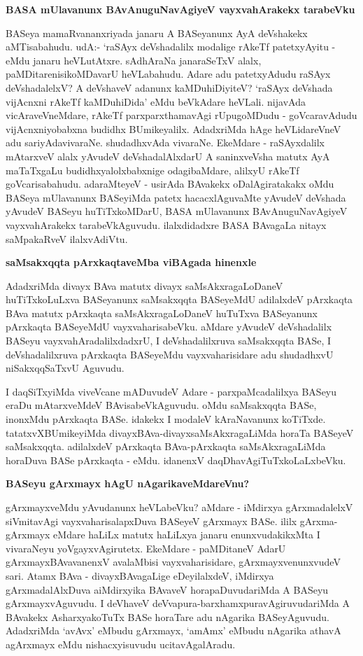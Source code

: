 {\bigskip
\noindent
{\large\bf BASA mUlavanunx BAvAnuguNavAgiyeV vayxvahArakekx tarabeVku}}\label{page10}
\medskip

\noindent
BASeya mamaRvananxriyada janaru A BASeyanunx AyA deVshakekx aMTisabahudu. udA:- `raSAyx deVshadalilx modalige rAkeTf patetxyAyitu - eMdu janaru heVLu\-tAtxre. sAdhAraNa janaraSeTxV alalx, paMDitarenisikoMDavarU heVLabahudu. Adare adu patetxyAdudu raSAyx deVshadalelxV? A \-deVshaveV adanunx kaMDuhiDiyiteV? `raSAyx deVshada vijAcnxni rAkeTf kaMDuhiDida' eMdu beVkAdare heVLali. nija\-vAda vicAra\-veVneMdare, rAkeTf parxparxthamavAgi rUpugoMDudu - goVcaravAdudu vijAcnxni\-yobabxna budidhx BUmikeyalilx. AdadxriMda hAge heVLidareVneV adu sariyAda\break viva\-raNe. shudadhxvAda vivaraNe. EkeMdare - raSAyxdalilx mAtarxveV alalx yAvudeV deVsha\-dalAlxdarU A saninxveVsha matutx AyA maTaTx\-gaLu budidhxyalolxbabxnige odagibaMdare, alilxyU rAkeTf goVcarisabahudu. adaraMteyeV - usi\-rAda BAvakekx oDalAgi\-ratakakx oMdu BASeya mUlavanunx BASeyiMda patetx hacacxlAguvaMte yAvudeV deVshada\- yAvudeV BASeyu huTiTxkoMDarU, BASA mUlavanunx BAvAnuguNa\-vAgiyeV vayxvahArakekx tarabeVkAguvudu. ilalxdidadxre BASA BAvagaLa nitayx saMpa\-kaRveV ilalxvAdiVtu.

{\bigskip
\noindent
{\large\bf saMsakxqqta pArxkaqtaveMba viBAgada hinenxle}}\label{page11}
\medskip

\noindent
AdadxriMda divayx BAva matutx divayx saMsAkxragaLoDaneV huTiTxkoLuLxva BASeyanunx saMsakxqqta BASe\-yeMdU adilalxdeV pArxkaqta BAva matutx pArxkaqta saMsAkxragaLoDaneV huTuTxva BASeyanunx pArxkaqta BASe\-yeMdU vayxvaharisabeVku. aMdare yAvudeV deVshadalilx BASeyu vayxvahAradalilxdadxrU, I deVshadalilxruva saMsakxqqta BASe, I deVshadalilxruva pArxkaqta BASeyeMdu vayxvaharisidare adu shudadhxvU niSakxqqSaTxvU Agu\-vudu.

I daqSiTxyiMda viveVcane mADuvudeV Adare - parxpaMcadalilxya BASeyu eraDu mAtarxveMdeV BAvisabeVkAguvudu. oMdu saMsakxqqta BASe, inonxMdu pArxkaqta BASe. idakekx I modaleV kAraNa\-vanunx koTiTxde. tatatxvXBUmikeyiMda divayxBAva-divayxsaMsAkxragaLiMda horaTa BASeyeV saMsakxqqta. adi\-lalxdeV pArxkaqta BAva-pArxkaqta saMsAkxragaLiMda horaDuva BASe pArxkaqta - eMdu. idanenxV daqDhavAgiTuTx\-koLaLxbeVku.

{\bigskip
\noindent
{\large\bf BASeyu gArxmayx hAgU nAgarikaveMdareVnu?}}\label{page11}
\medskip

\noindent
gArxmayxveMdu yAvudanunx heVLabeVku? aMdare - iMdirxya gArxmadalelxV siVmitavAgi vayxvaharisa\-lapxDuva BASeyeV gArxmayx BASe. ililx gArxma-gArxmayx eMdare haLiLx matutx haLiLxya janaru enunxvudakikxMta I vivaraNeyu yoVgayxvAgirutetx. EkeMdare - paMDitaneV AdarU gArxmayxBAvavanenxV avalaMbisi vayxva\-harisi\-dare, gArxmayxvenunxvudeV sari. Atamx BAva - divayxBAvagaLige eDeyilalxdeV, iMdirxya gArxmadalAlxDuva aiMdirxyika BAvaveV horapaDuvudariMda A BASeyu gArxmayxvAguvudu. I deVhaveV deVvapura-barxhamx\-pura\-vAgiruvudariMda A BAvakekx AsharxyakoTuTx BASe horaTare adu nAgarika BASeyAguvudu. Adadx\-riMda `avAvx' eMbudu gArxmayx, `amAmx' eMbudu nAgarika athavA agArxmayx eMdu nishacxyisuvudu ucitavAgalAradu. 

